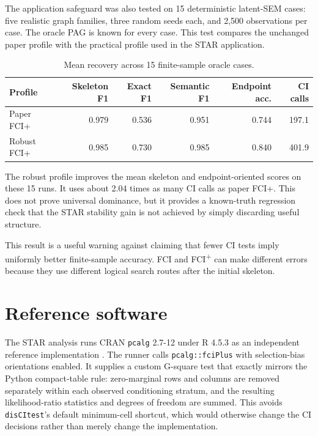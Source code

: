 \documentclass[11pt,a4paper,oneside]{report}
\newcommand{\FCIplus}{FCI\textsuperscript{+}}
\newcommand{\code}[1]{\texttt{#1}}
\begin{document}
The application safeguard was also tested on 15 deterministic latent-SEM
cases: five realistic graph families, three random seeds each, and 2,500
observations per case. The oracle PAG is known for every case. This test
compares the unchanged paper profile with the practical profile used in the
STAR application.

\begin{table}[H]
\centering
\caption{Mean recovery across 15 finite-sample oracle cases.}
\label{tab:robust-finite-sample}
\begin{tabular}{lrrrrr}
\toprule
Profile & Skeleton F1 & Exact F1 & Semantic F1 & Endpoint acc. & CI calls \\
\midrule
Paper FCI+ & 0.979 & 0.536 & 0.951 & 0.744 & 197.1 \\
Robust FCI+ & 0.985 & 0.730 & 0.985 & 0.840 & 401.9 \\
\bottomrule
\end{tabular}
\end{table}

The robust profile improves the mean skeleton and endpoint-oriented scores on
these 15 runs. It uses about 2.04 times as many CI calls as paper FCI+.
This does not prove universal dominance, but it provides a known-truth
regression check that the STAR stability gain is not achieved by simply
discarding useful structure.

This result is a useful warning against claiming that fewer CI tests imply
uniformly better finite-sample accuracy. FCI and \FCIplus{} can make different
errors because they use different logical search routes after the initial
skeleton.

\section{Reference software}

The STAR analysis runs CRAN \code{pcalg} 2.7-12 under R 4.5.3 as an independent
reference implementation \citep{kalisch2012pcalg}. The runner calls
\code{pcalg::fciPlus} with selection-bias orientations enabled. It supplies a
custom G-square test that exactly mirrors the Python compact-table rule:
zero-marginal rows and columns are removed separately within each observed
conditioning stratum, and the resulting likelihood-ratio statistics and
degrees of freedom are summed. This avoids \code{disCItest}'s default
minimum-cell shortcut, which would otherwise change the CI decisions rather
than merely change the implementation.
\end{document}

